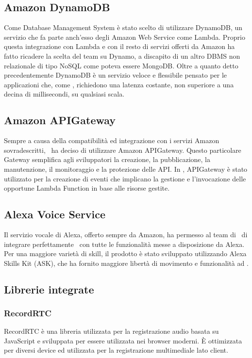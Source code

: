 \documentclass[../ManualeSviluppatore_v1.0.0.tex]{subfiles}
\begin{document}
	\subsection{Amazon DynamoDB}
		Come \gls{Database Management System} è stato scelto di utilizzare DynamoDB, un servizio che fa parte anch'esso degli Amazon Web Service come Lambda. Proprio questa integrazione con Lambda e con il resto di servizi offerti da Amazon ha fatto ricadere la scelta del team su Dynamo, a discapito di un altro DBMS non relazionale di tipo NoSQL come poteva essere MongoDB. Oltre a quanto detto precedentemente DynamoDB è un servizio veloce e flessibile pensato per le applicazioni che, come \atavi, richiedono una latenza costante, non superiore a una decina di millisecondi, su qualsiasi scala.
	\subsection{Amazon APIGateway}
		Sempre a causa della compatibilità ed integrazione con i servizi Amazon sovradescritti, \kpanic\ ha deciso di utilizzare Amazon APIGateway. Questo particolare Gateway semplifica agli sviluppatori la creazione, la pubblicazione, la manutenzione, il monitoraggio e la protezione delle API. In \atavi, APIGateway è stato utilizzato per la creazione di eventi che implicano la gestione e l'invocazione delle opportune Lambda Function in base alle risorse gestite.
	\subsection{Alexa Voice Service}
		Il servizio vocale di Alexa, offerto sempre da Amazon, ha permesso al team di \kpanic\ di integrare perfettamente \atavi\ con tutte le funzionalità messe a disposizione da Alexa. Per una maggiore varietà di skill, il prodotto è stato sviluppato utilizzando Alexa Skills Kit (\gls{ASK}), che ha fornito maggiore libertà di movimento e funzionalità ad \atavi.
	\subsection{Librerie integrate}
		\subsubsection{RecordRTC}
			RecordRTC è una libreria utilizzata per la registrazione audio basata su JavaScript e sviluppata per essere utilizzata nei browser moderni. È ottimizzata per diversi device ed utilizzata per la registrazione multimediale lato client.
\end{document}
